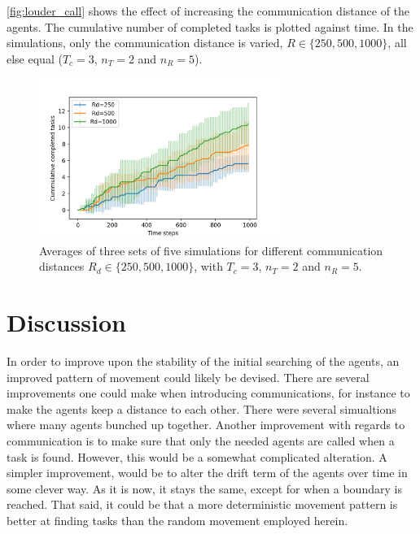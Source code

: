 \documentclass[11pt]{article}
\begin{document}
    \autoref{fig:louder_call} shows the effect of increasing the communication 
    distance of the agents. The cumulative number of completed tasks is plotted 
    against time. In the simulations, only the communication distance is varied,
    $R \in \{250, 500, 1000\}$, all else equal ($T_c = 3$, $n_T=2$ and $n_R=5$).

    \begin{figure}
        \centering
        \includegraphics[width=0.7\textwidth]{figures/louder_call.png}
        \caption{
            Averages of three sets of five simulations for different 
            communication distances $R_d \in \{250, 500, 1000\}$,
            with $T_c = 3$, $n_T=2$ and $n_R=5$.
        }
        \label{fig:louder_call}
    \end{figure}

    \section{Discussion}

    In order to improve upon the stability of the initial searching of the agents,
    an improved pattern of movement could likely be devised. There are several
    improvements one could make when introducing communications, for instance to make
    the agents keep a distance to each other. There were several simualtions where many
    agents bunched up together.
    Another improvement with regards to communication 
    is to make sure that only the needed agents are called when a task is found. However,
    this would be a somewhat complicated alteration.
    A simpler improvement, would be to alter the drift 
    term of the agents over time in some clever way.
    As it is now, it stays the same, except for when 
    a boundary is reached. That said, it could be that a more deterministic movement 
    pattern is better at finding tasks than the random movement employed herein.
    
\end{document}
